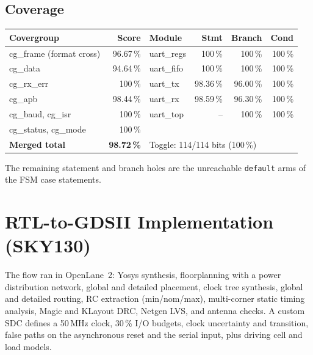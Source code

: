 \documentclass[11pt,a4paper]{article}
\newcommand{\sect}[1]{\section{\textcolor{accent}{#1}}}
\begin{document}
\subsection*{Coverage}
\begin{center}
\small
\begin{tabular}{lr@{\hspace{1.4cm}}lrrr}
\toprule
\textbf{Covergroup} & \textbf{Score} & \textbf{Module} & \textbf{Stmt} & \textbf{Branch} & \textbf{Cond}\\
\midrule
cg\_frame (format cross) & 96.67\,\% & uart\_regs & 100\,\% & 100\,\% & 100\,\% \\
cg\_data & 94.64\,\% & uart\_fifo & 100\,\% & 100\,\% & 100\,\% \\
cg\_rx\_err & 100\,\% & uart\_tx & 98.36\,\% & 96.00\,\% & 100\,\% \\
cg\_apb & 98.44\,\% & uart\_rx & 98.59\,\% & 96.30\,\% & 100\,\% \\
cg\_baud, cg\_isr & 100\,\% & uart\_top & -- & 100\,\% & 100\,\% \\
cg\_status, cg\_mode & 100\,\% & & & & \\
\midrule
\textbf{Merged total} & \textbf{98.72\,\%} & \multicolumn{4}{l}{Toggle: 114/114 bits (100\,\%)} \\
\bottomrule
\end{tabular}
\end{center}
The remaining statement and branch holes are the unreachable \texttt{default} arms of the FSM case statements.

\sect{RTL-to-GDSII Implementation (SKY130)}
The flow ran in OpenLane~2: Yosys synthesis, floorplanning with a power distribution network, global and detailed placement, clock tree synthesis, global and detailed routing, RC extraction (min/nom/max), multi-corner static timing analysis, Magic and KLayout DRC, Netgen LVS, and antenna checks. A custom SDC defines a 50\,MHz clock, 30\,\% I/O budgets, clock uncertainty and transition, false paths on the asynchronous reset and the serial input, plus driving cell and load models.
\end{document}
